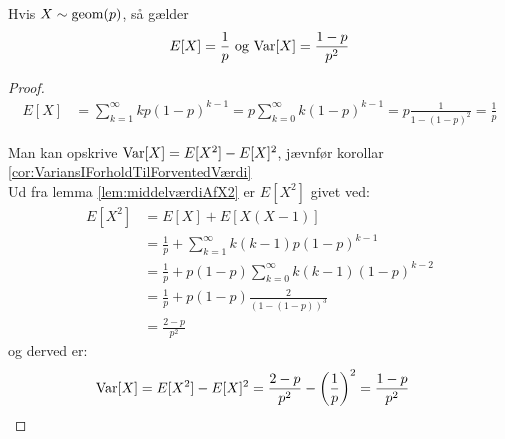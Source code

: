\begin{prop} %
\label{prop:geomEgenskaber}
Hvis $X \sim \textnormal{geom} (p)$, så gælder 
\begin{align*}
    E[X] = \frac{1}{p} \text{ og } \textnormal{Var}[X] = \frac{1-p}{p^2}
\end{align*}
\end{prop}

\begin{proof}
\begin{align*}
    E[X]&=\sum_{k=1}^\infty kp(1-p)^{k-1} =p\sum_{k=0}^\infty k(1-p)^{k-1}=p\frac{1}{1-(1-p)^2}=\frac{1}{p}
\end{align*}

Man kan opskrive $\textnormal{Var}[X] =E[X^2]-E[X]^2$, jævnfør korollar \ref{cor:VariansIForholdTilForventedVærdi}\\
Ud fra lemma \ref{lem:middelværdiAfX2} er $E[X^2]$ givet ved:
\begin{align*}
E[X^2]&=E[X]+E[X(X-1)]\\
    &=\frac{1}{p}+\sum_{k=1}^{\infty}k(k-1)p(1-p)^{k-1}\\
    &=\frac{1}{p} + p(1-p)\sum_{k=0}^{\infty}k(k-1)(1-p)^{k-2}\\
    &=\frac{1}{p}+p(1-p)\frac{2}{(1-(1-p))^3}\\
    &=\frac{2-p}{p^2}
\end{align*}
og derved er:
\begin{align*}
     \textnormal{Var}[X]&=E[X^2]-E[X]^2
     =\frac{2-p}{p^2}-\left(\frac{1}{p}\right)^2=\frac{1-p}{p^2}
\end{align*}
\end{proof}

